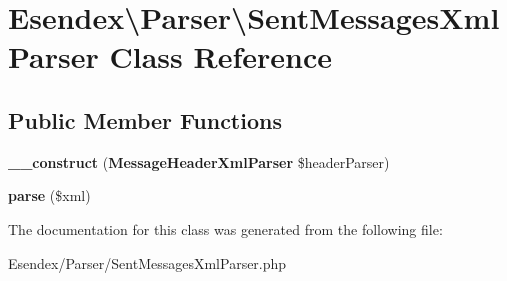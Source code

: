 \section{Esendex\textbackslash{}Parser\textbackslash{}Sent\-Messages\-Xml\-Parser Class Reference}
\label{class_esendex_1_1_parser_1_1_sent_messages_xml_parser}
\subsection*{Public Member Functions}
\begin{DoxyCompactItemize}
\item 
{\bfseries \-\_\-\-\_\-construct} ({\bf Message\-Header\-Xml\-Parser} \$header\-Parser)\label{class_esendex_1_1_parser_1_1_sent_messages_xml_parser_a1be51463cdfca540522f04c35eccb99d}

\item 
{\bfseries parse} (\$xml)\label{class_esendex_1_1_parser_1_1_sent_messages_xml_parser_abdc5f264ed60250c44187d3e07ee1464}

\end{DoxyCompactItemize}


The documentation for this class was generated from the following file\-:\begin{DoxyCompactItemize}
\item 
Esendex/\-Parser/Sent\-Messages\-Xml\-Parser.\-php\end{DoxyCompactItemize}
